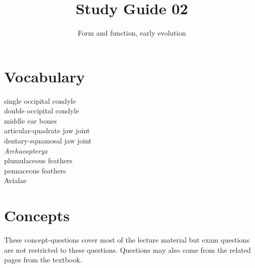 \documentclass[nofonts, letterpaper]{tufte-handout}
\title{Study Guide 02}
\author{Form and function, early evolution}
\date{} %
\begin{document}
\maketitle	%


\section{Vocabulary}
\vspace{-1\baselineskip}
\begin{multicols}{2}
\noindent single occipital condyle \\
double occipital condyle \\
middle ear bones \\
articular-quadrate jaw joint \\
dentary-squamosal jaw joint \\
\textit{Archaeopteryx} \\
plumulaceous feathers \\
pennaceous feathers \\
Avialae 
\end{multicols}

\section{Concepts}

These concept-questions cover most of the lecture material but exam questions are not restricted to these questions. Questions may also come from the related pages from the textbook.\vspace{\baselineskip}
\end{document}
